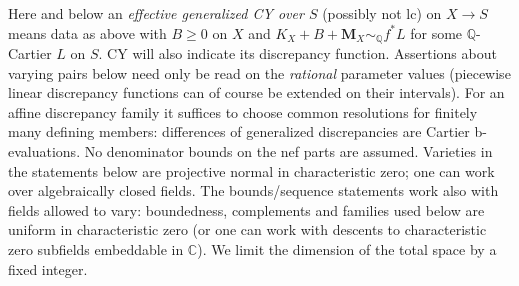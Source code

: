 Here and below an \emph{effective generalized CY over \(S\)} (possibly not lc) on \(X\to S\) means data as above with \(B\ge0\) on \(X\) and \(K_X+B+\mathbf M_X\sim_{\mathbb Q} f^*L\) for some \(\mathbb Q\)-Cartier \(L\) on \(S\).
CY will also indicate its discrepancy function.
Assertions about varying pairs below need only be read on the \emph{rational} parameter values (piecewise linear discrepancy functions can of course be extended on their intervals).
For an affine discrepancy family it suffices to choose common resolutions for finitely many defining members: differences of generalized discrepancies are Cartier b-evaluations.
No denominator bounds on the nef parts are assumed.
Varieties in the statements below are projective normal in characteristic zero; one can work over algebraically closed fields.
The bounds/sequence statements work also with fields allowed to vary: boundedness, complements and families used below are uniform in characteristic zero (or one can work with descents to characteristic zero subfields embeddable in \(\mathbb C\)).
We limit the dimension of the total space by a fixed integer.

